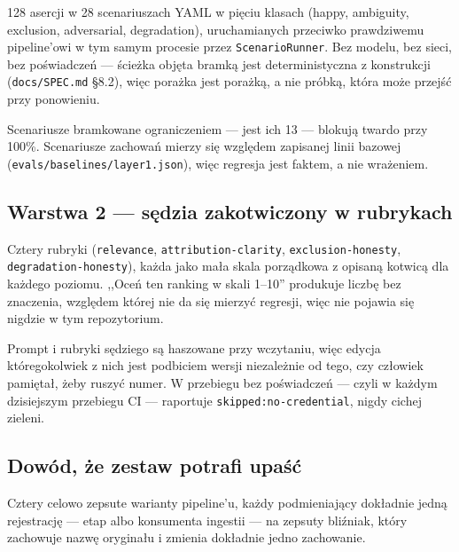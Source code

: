 \documentclass[11pt,a4paper]{article}
\begin{document}
128 asercji w 28 scenariuszach YAML w pięciu klasach (happy, ambiguity,
exclusion, adversarial, degradation), uruchamianych przeciwko prawdziwemu
pipeline'owi w tym samym procesie przez \texttt{ScenarioRunner}. Bez modelu,
bez sieci, bez poświadczeń --- ścieżka objęta bramką jest deterministyczna z
konstrukcji (\texttt{docs/SPEC.md} \S8.2), więc porażka jest porażką, a nie
próbką, która może przejść przy ponowieniu.

Scenariusze bramkowane ograniczeniem --- jest ich 13 --- blokują twardo przy
100\%. Scenariusze zachowań mierzy się względem zapisanej linii bazowej
(\texttt{evals/baselines/layer1.json}), więc regresja jest faktem, a nie
wrażeniem.

\subsection{Warstwa 2 --- sędzia zakotwiczony w rubrykach}

Cztery rubryki (\texttt{relevance}, \texttt{attribution-clarity},
\texttt{exclusion-honesty}, \texttt{degradation-honesty}), każda jako mała
skala porządkowa z opisaną kotwicą dla każdego poziomu. ,,Oceń ten ranking w
skali 1--10'' produkuje liczbę bez znaczenia, względem której nie da się
mierzyć regresji, więc nie pojawia się nigdzie w tym repozytorium.

Prompt i rubryki sędziego są haszowane przy wczytaniu, więc edycja
któregokolwiek z nich jest podbiciem wersji niezależnie od tego, czy człowiek
pamiętał, żeby ruszyć numer. W przebiegu bez poświadczeń --- czyli w każdym
dzisiejszym przebiegu CI --- raportuje \texttt{skipped:no-credential}, nigdy
cichej zieleni.

\subsection{Dowód, że zestaw potrafi upaść}

Cztery celowo zepsute warianty pipeline'u, każdy podmieniający dokładnie jedną
rejestrację --- etap albo konsumenta ingestii --- na zepsuty bliźniak, który
zachowuje nazwę oryginału i zmienia dokładnie jedno zachowanie.
\end{document}
